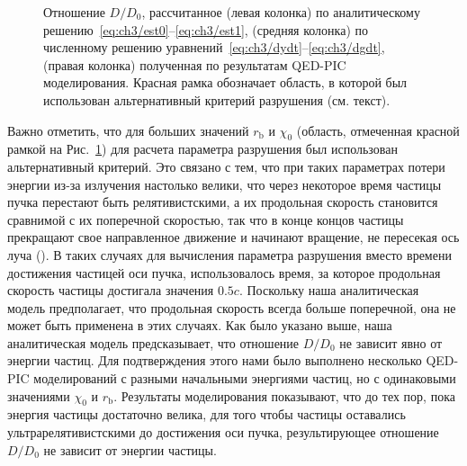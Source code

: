 \begin{figure}[ht]
    \caption[Сравнение отношения параметра разрушения с учётом реакции излучения к таковому без учёта реакции излучения, рассчитанного различными способами]{\label{fig:ch3/disruption} 
    Отношение $D/ D_0$, рассчитанное (левая колонка) по аналитическому решению~\eqref{eq:ch3/est0}--\eqref{eq:ch3/est1}, (средняя колонка) по численному решению уравнений~\eqref{eq:ch3/dydt}--\eqref{eq:ch3/dgdt}, (правая колонка) полученная по результатам QED-PIC моделирования.
    Красная рамка обозначает область, в которой был использован альтернативный критерий разрушения (см. текст).}
\end{figure}

Важно отметить, что для больших значений $r_\mathrm{b}$ и $\chi_0$ (область, отмеченная красной рамкой на Рис.~\ref{fig:ch3/disruption}) для расчета параметра разрушения был использован альтернативный критерий.
Это связано с тем, что при таких параметрах потери энергии из-за излучения настолько велики, что через некоторое время частицы пучка перестают быть релятивистскими, а их продольная скорость становится сравнимой с их поперечной скоростью, так что в конце концов частицы прекращают свое направленное движение и начинают вращение, не пересекая ось луча ().
В таких случаях для вычисления параметра разрушения вместо времени достижения частицей оси пучка, использовалось время, за которое продольная скорость частицы достигала значения $0.5c$.
Поскольку наша аналитическая модель предполагает, что продольная скорость всегда больше поперечной, она не может быть применена в этих случаях.
Как было указано выше, наша аналитическая модель предсказывает, что отношение $D/D_0$ не зависит явно от энергии частиц.
Для подтверждения этого нами было выполнено несколько QED-PIC моделирований с разными начальными энергиями частиц, но с одинаковыми значениями $\chi_0$ и $r_\mathrm{b}$.
Результаты моделирования показывают, что до тех пор, пока энергия частицы достаточно велика, для того чтобы частицы оставались ультрарелятивистскими до достижения оси пучка, результирующее отношение $D/D_0$ не зависит от энергии частицы.


